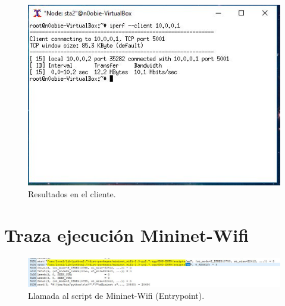 \begin{figure}[!htb]
  \centering
    \includegraphics[width=0.7\linewidth]{./img/anexos/4.JPG}
    \caption{Resultados en el cliente.}
  \label{fig:yo}
\end{figure}
\newpage
\chapter{Traza ejecución Mininet-Wifi}
\begin{figure}[!htb]
  \centering
    \includegraphics[width=\linewidth]{./img/util/fin.JPG}
    \caption{Llamada al script de Mininet-Wifi (Entrypoint).}
  \label{fig:yo}
\end{figure}
